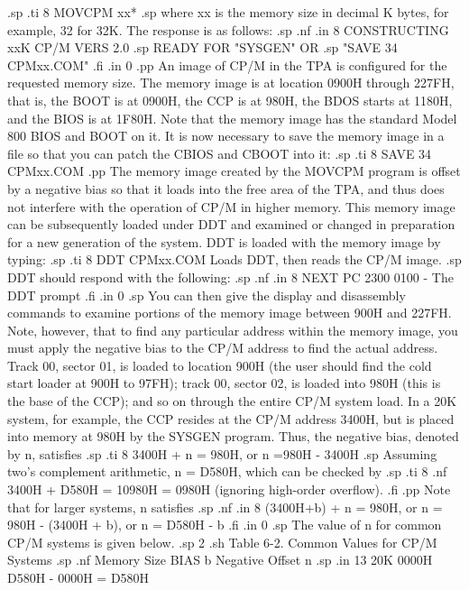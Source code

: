 .sp
.ti 8
MOVCPM xx*
.sp
where xx is the memory size in decimal K bytes, for example, 32 
for 32K.  The response is as follows:
.sp
.nf
.in 8
CONSTRUCTING xxK CP/M VERS 2.0
.sp
READY FOR "SYSGEN" OR
.sp
"SAVE 34 CPMxx.COM"
.fi
.in 0
.pp
An image of CP/M in the TPA is configured for the requested 
memory size.  The memory image is at location 0900H through 
227FH, that is, the BOOT is at 0900H, the CCP is at 980H, the 
BDOS starts at 1180H, and the BIOS is at 1F80H.  Note that the 
memory image has the standard Model 800 BIOS and BOOT on it.  It is now 
necessary to save the memory image in a file so that you can 
patch the CBIOS and CBOOT into it:
.sp
.ti 8
SAVE 34 CPMxx.COM
.pp
The memory image created by the MOVCPM program is offset by a 
negative bias so that it loads into the free area of the TPA, and 
thus does not interfere with the operation of CP/M in higher 
memory.  This memory image can be subsequently loaded under DDT 
and examined or changed in preparation for a new generation of 
the system.  DDT is loaded with the memory image by typing:
.sp
.ti 8
DDT CPMxx.COM       Loads DDT, then reads the CP/M image.
.sp
DDT should respond with the following:
.sp
.nf
.in 8
NEXT PC
2300 0100
-                                          The DDT prompt
.fi
.in 0
.sp
You can then give the display and disassembly commands to examine
portions of the memory image between 900H and 227FH.
Note, however, that to find any particular address 
within the memory image, you must apply the negative bias to the 
CP/M address to find the actual address.  Track 00, sector 01, is 
loaded to location 900H (the user should find the cold start 
loader at 900H to 97FH); track 00, sector 02, is loaded into 980H 
(this is the base of the CCP); and so on through the entire CP/M 
system load.  In a 20K system, for example, the CCP resides at 
the CP/M address 3400H, but is placed into memory at 980H by the 
SYSGEN program.  Thus, the negative bias, denoted by n, satisfies
.sp
.ti 8
3400H + n = 980H, or n =980H - 3400H
.sp
Assuming two's complement arithmetic, n = D580H, which can be 
checked by
.sp
.ti 8
.nf
3400H + D580H = 10980H = 0980H (ignoring high-order
                                       overflow).
.fi
.pp
Note that for larger systems, n satisfies
.sp
.nf
.in 8
(3400H+b) + n = 980H, or
n = 980H - (3400H + b), or
n = D580H - b
.fi
.in 0
.sp
The value of n for common CP/M systems is given below.
.sp 2
.sh
           Table 6-2.  Common Values for CP/M Systems
.sp
.nf
         Memory Size      BIAS b      Negative Offset n
.sp
.in 13
20K          0000H     D580H - 0000H = D580H
